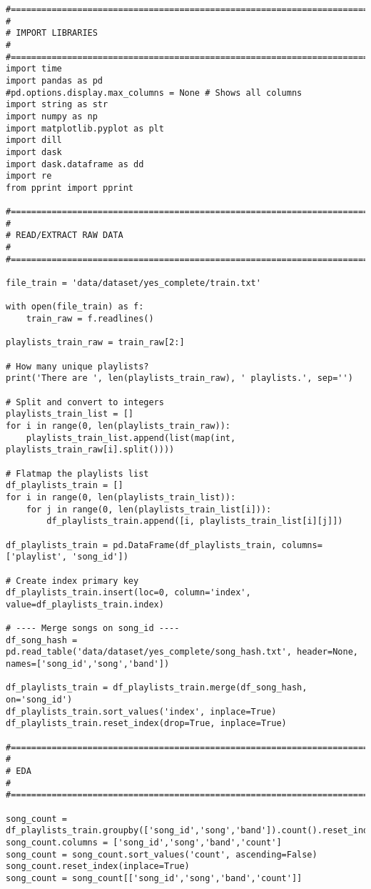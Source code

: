 \documentclass[11pt]{article}
\begin{document}
    \begin{verbatim}
#==============================================================================
#
# IMPORT LIBRARIES
# 
#==============================================================================
import time
import pandas as pd
#pd.options.display.max_columns = None # Shows all columns
import string as str
import numpy as np
import matplotlib.pyplot as plt
import dill
import dask
import dask.dataframe as dd
import re
from pprint import pprint

#==============================================================================
# 
# READ/EXTRACT RAW DATA
# 
#==============================================================================

file_train = 'data/dataset/yes_complete/train.txt'

with open(file_train) as f:
    train_raw = f.readlines()
    
playlists_train_raw = train_raw[2:]

# How many unique playlists?
print('There are ', len(playlists_train_raw), ' playlists.', sep='')

# Split and convert to integers
playlists_train_list = []
for i in range(0, len(playlists_train_raw)):
    playlists_train_list.append(list(map(int, playlists_train_raw[i].split())))
    
# Flatmap the playlists list
df_playlists_train = []
for i in range(0, len(playlists_train_list)):
    for j in range(0, len(playlists_train_list[i])):
        df_playlists_train.append([i, playlists_train_list[i][j]])
        
df_playlists_train = pd.DataFrame(df_playlists_train, columns=['playlist', 'song_id'])

# Create index primary key
df_playlists_train.insert(loc=0, column='index', value=df_playlists_train.index)

# ---- Merge songs on song_id ----
df_song_hash = pd.read_table('data/dataset/yes_complete/song_hash.txt', header=None, names=['song_id','song','band'])

df_playlists_train = df_playlists_train.merge(df_song_hash, on='song_id')
df_playlists_train.sort_values('index', inplace=True)
df_playlists_train.reset_index(drop=True, inplace=True)

#==============================================================================
#
# EDA
# 
#==============================================================================

song_count = df_playlists_train.groupby(['song_id','song','band']).count().reset_index().drop(columns='index')
song_count.columns = ['song_id','song','band','count']
song_count = song_count.sort_values('count', ascending=False)
song_count.reset_index(inplace=True)
song_count = song_count[['song_id','song','band','count']]


\end{verbatim}
\end{document}
